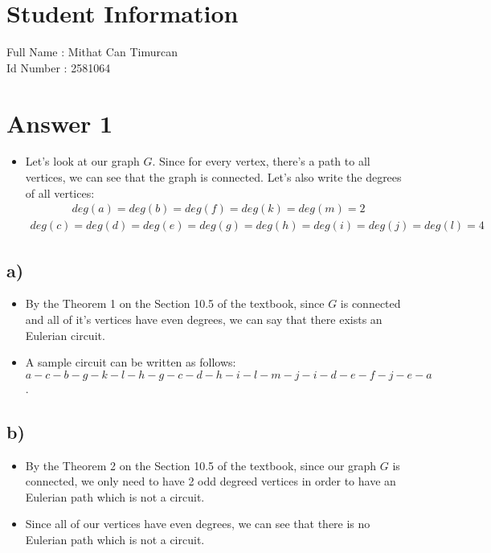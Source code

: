 \documentclass[12pt]{article}
\begin{document}
\section*{Student Information } 
Full Name : Mithat Can Timurcan\\
Id Number :  2581064\\

\section*{Answer 1}
\begin{itemize}
 \item Let's look at our graph $G$. Since for every vertex, there's a path to all vertices, we can see that the graph is connected. Let's also write the degrees of all vertices:
 \begin{equation*}
  \begin{split}
   deg(a) = deg(b) = deg(f) = deg(k) = deg(m) = 2
  \end{split}
 \end{equation*}
 \begin{equation*}
  \begin{split}
   deg(c) = deg(d) = deg(e) = deg(g) = deg(h) = deg(i) = deg(j) = deg(l) = 4
  \end{split}
 \end{equation*}
\end{itemize}

\subsection*{a)}
\begin{itemize}
 \item By the Theorem 1 on the Section 10.5 of the textbook, since $G$ is connected and all of it's vertices have even degrees, we can say that there exists an Eulerian circuit.
 \item A sample circuit can be written as follows: $a-c-b-g-k-l-h-g-c-d-h-i-l-m-j-i-d-e-f-j-e-a$.
\end{itemize}
\subsection*{b)}
\begin{itemize}
 \item By the Theorem 2 on the Section 10.5 of the textbook, since our graph $G$ is connected, we only need to have 2 odd degreed vertices in order to have an Eulerian path which is not a circuit.
 \item Since all of our vertices have even degrees, we can see that there is no Eulerian path which is not a circuit.
\end{itemize}
\end{document}
